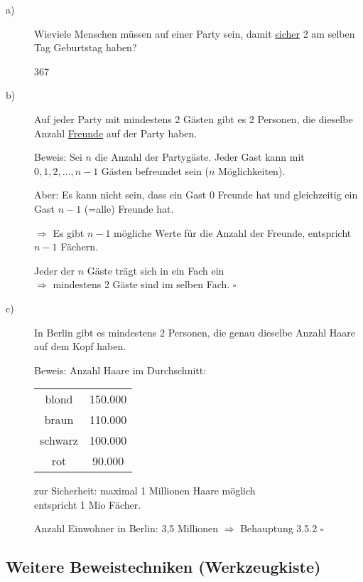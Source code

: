 \documentclass[a4paper, 12pt, twoside] {article}
\begin{document}
\begin{description}
\item[a)]
Wieviele Menschen müssen auf einer Party sein, damit \underline{sicher} 2 am selben Tag Geburtstag haben?

367

\item[b)]
Auf jeder Party mit mindestens 2 Gästen gibt es 2 Personen, die dieselbe Anzahl \underline{Freunde} auf der Party haben.

Beweis: Sei $n$ die Anzahl der Partygäste. Jeder Gast kann mit $0, 1, 2, ..., n-1$ Gästen befreundet sein ($n$ Möglichkeiten).

Aber: Es kann nicht sein, dass ein Gast $0$ Freunde hat und gleichzeitig ein Gast $n-1$ (=alle) Freunde hat.

$\Rightarrow$ Es gibt $n-1$ mögliche Werte für die Anzahl der Freunde, entspricht $n-1$ Fächern.

Jeder der $n$ Gäste trägt sich in ein Fach ein \\
$\Rightarrow$ mindestens $2$ Gäste sind im selben Fach. \hfill $\square$

\item[c)]
In Berlin gibt es mindestens 2 Personen, die genau dieselbe Anzahl Haare auf dem Kopf haben.

Beweis: Anzahl Haare im Durchschnitt:

\begin{tabular}{ c c }
blond & 150.000 \\
braun & 110.000 \\
schwarz & 100.000 \\
rot & 90.000
\end{tabular}

zur Sicherheit: maximal 1 Millionen Haare möglich \\
entspricht 1 Mio Fächer.

Anzahl Einwohner in Berlin: 3,5 Millionen $\Rightarrow$ Behauptung 3.5.2 \hfill $\square$

\end{description}

\subsection{Weitere Beweistechniken (Werkzeugkiste)} %
\end{document}
